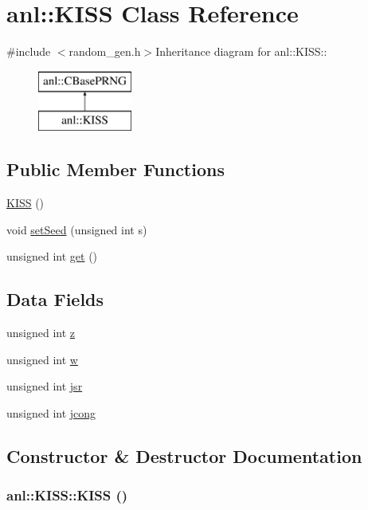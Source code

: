 \hypertarget{classanl_1_1KISS}{
\section{anl::KISS Class Reference}
\label{classanl_1_1KISS}
}


{\ttfamily \#include $<$random\_\-gen.h$>$}Inheritance diagram for anl::KISS::\begin{figure}[H]
\begin{center}
\leavevmode
\includegraphics[height=2cm]{classanl_1_1KISS}
\end{center}
\end{figure}
\subsection*{Public Member Functions}
\begin{DoxyCompactItemize}
\item 
\hyperlink{classanl_1_1KISS_af6f3404f64fc19491db26df5cbddba1a}{KISS} ()
\item 
void \hyperlink{classanl_1_1KISS_a975aa76ee0371fc8da9afae199192e04}{setSeed} (unsigned int s)
\item 
unsigned int \hyperlink{classanl_1_1KISS_a1025043c844dd93d33bedf412fef9cc3}{get} ()
\end{DoxyCompactItemize}
\subsection*{Data Fields}
\begin{DoxyCompactItemize}
\item 
unsigned int \hyperlink{classanl_1_1KISS_a8d6d53a11fa1eea98fa84780cf67e3a8}{z}
\item 
unsigned int \hyperlink{classanl_1_1KISS_affa7ff0848714aaaa358f045e915e467}{w}
\item 
unsigned int \hyperlink{classanl_1_1KISS_a24b0a5cd1dbc5da7d1f11ff1858d3fd3}{jsr}
\item 
unsigned int \hyperlink{classanl_1_1KISS_a3b6d6d43e69568d6c94f2c60ded0398a}{jcong}
\end{DoxyCompactItemize}


\subsection{Constructor \& Destructor Documentation}
\hypertarget{classanl_1_1KISS_af6f3404f64fc19491db26df5cbddba1a}{
\subsubsection[{KISS}]{\setlength{\rightskip}{0pt plus 5cm}anl::KISS::KISS ()}}
\label{classanl_1_1KISS_af6f3404f64fc19491db26df5cbddba1a}


